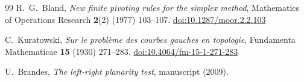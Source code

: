 \documentclass[11pt]{article}
\theoremstyle{remark}
\newcommand{\doi}[1]{\href{https://doi.org/#1}{doi:#1}}
\begin{document}
{\begin{thebibliography}{99}
 R.\ G.\ Bland, \emph{New finite pivoting rules for the simplex method}, Mathematics of Operations Research \textbf{2}(2) (1977) 103--107. \doi{10.1287/moor.2.2.103}

 C.\ Kuratowski, \emph{Sur le probl\`eme des courbes gauches en topologie}, Fundamenta Mathematicae \textbf{15} (1930) 271--283. \doi{10.4064/fm-15-1-271-283}

 U.\ Brandes, \emph{The left-right planarity test}, manuscript (2009).

\end{thebibliography}
}
\end{document}
